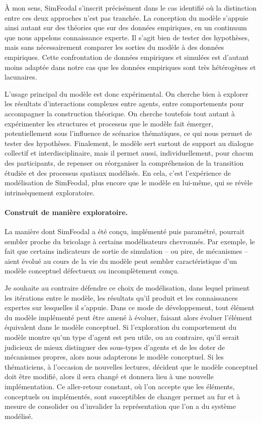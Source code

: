 À mon sens, SimFeodal s'inscrit précisément dans le cas identifié où la distinction entre ces deux approches n'est pas tranchée.
La conception du modèle s'appuie ainsi autant sur des théories que sur des données empiriques, en un continuum que nous appelons \og connaissance experte\fg{}.
Il s'agit bien de tester des hypothèses, mais sans nécessairement comparer les sorties du modèle à des données empiriques.
Cette confrontation de données empiriques et simulées est d'autant moins adaptée dans notre cas que les données empiriques sont très hétérogènes et lacunaires.

L'usage principal du modèle est donc expérimental.
On cherche bien à explorer les résultats d'interactions complexes entre agents, entre comportements pour accompagner la construction théorique.
On cherche toutefois tout autant à expérimenter les structures et processus que le modèle fait émerger, potentiellement sous l'influence de \og scénarios thématiques\fg{}, ce qui nous permet de tester des hypothèses.
Finalement, le modèle sert surtout de support au dialogue collectif et interdisciplinaire, mais il permet aussi, individuellement, pour chacun des participants, de repenser ou réorganiser la compréhension de la transition étudiée et des processus spatiaux modélisés.
En cela, c'est l'expérience de modélisation de SimFeodal, plus encore que le modèle en lui-même, qui se révèle intrinsèquement exploratoire.

\paragraph{Construit de manière exploratoire.}

La manière dont SimFeodal a été conçu, implémenté puis paramétré, pourrait sembler proche du \og bricolage\fg{} à certains modélisateurs chevronnés.
Par exemple, le fait que certains indicateurs de sortie de simulation -- ou pire, de mécanismes -- aient évolué au cours de la vie du modèle peut sembler caractéristique d'un modèle conceptuel défectueux ou incomplètement conçu.

Je souhaite au contraire défendre ce choix de modélisation, dans lequel priment les itérations entre le modèle, les résultats qu'il produit et les connaissances expertes sur lesquelles il s'appuie.
Dans ce mode de développement, tout élément du modèle implémenté peut être amené à évoluer, faisant alors évoluer l'élément équivalent dans le modèle conceptuel.
Si l'exploration du comportement du modèle montre qu'un type d'agent est peu utile, ou au contraire, qu'il serait judicieux de mieux distinguer des sous-types d'agents et de les doter de mécanismes propres, alors nous adapterons le modèle conceptuel.
Si les thématiciens, à l'occasion de nouvelles lectures, décident que le modèle conceptuel doit être modifié, alors il sera changé et donnera lieu à une nouvelle implémentation.
Ce aller-retour constant, où l'on accepte que les éléments, conceptuels ou implémentés, sont susceptibles de changer permet au fur et à mesure de consolider ou d'invalider la représentation que l'on a du système modélisé.

